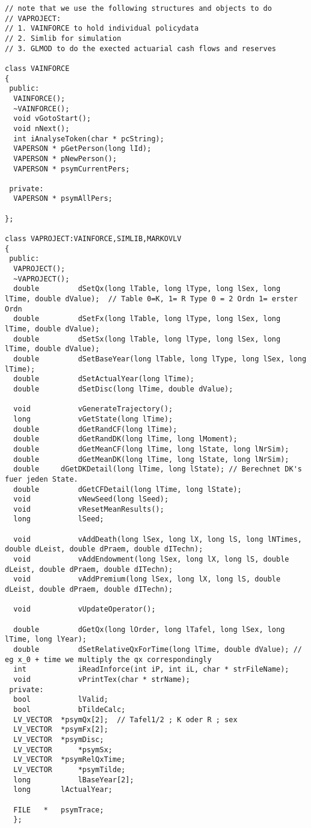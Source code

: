 \documentclass[10pt, a4paper,landscape]{article}
\begin{document}
\begin{verbatim}
// note that we use the following structures and objects to do
// VAPROJECT:
// 1. VAINFORCE to hold individual policydata
// 2. Simlib for simulation
// 3. GLMOD to do the exected actuarial cash flows and reserves

class VAINFORCE
{
 public:
  VAINFORCE();
  ~VAINFORCE();
  void vGotoStart();
  void nNext();
  int iAnalyseToken(char * pcString);
  VAPERSON * pGetPerson(long lId);
  VAPERSON * pNewPerson();
  VAPERSON * psymCurrentPers;

 private:
  VAPERSON * psymAllPers;

};

class VAPROJECT:VAINFORCE,SIMLIB,MARKOVLV
{
 public:
  VAPROJECT();
  ~VAPROJECT();
  double         dSetQx(long lTable, long lType, long lSex, long lTime, double dValue);  // Table 0=K, 1= R Type 0 = 2 Ordn 1= erster Ordn  
  double         dSetFx(long lTable, long lType, long lSex, long lTime, double dValue);
  double         dSetSx(long lTable, long lType, long lSex, long lTime, double dValue);
  double         dSetBaseYear(long lTable, long lType, long lSex, long lTime);
  double         dSetActualYear(long lTime);
  double         dSetDisc(long lTime, double dValue);

  void           vGenerateTrajectory();
  long           vGetState(long lTime);
  double         dGetRandCF(long lTime);
  double         dGetRandDK(long lTime, long lMoment);
  double         dGetMeanCF(long lTime, long lState, long lNrSim);
  double         dGetMeanDK(long lTime, long lState, long lNrSim);
  double	 dGetDKDetail(long lTime, long lState); // Berechnet DK's fuer jeden State.
  double         dGetCFDetail(long lTime, long lState);
  void           vNewSeed(long lSeed);
  void           vResetMeanResults();
  long           lSeed;

  void           vAddDeath(long lSex, long lX, long lS, long lNTimes, double dLeist, double dPraem, double dITechn); 
  void           vAddEndowment(long lSex, long lX, long lS, double dLeist, double dPraem, double dITechn);
  void           vAddPremium(long lSex, long lX, long lS, double dLeist, double dPraem, double dITechn);

  void           vUpdateOperator();

  double         dGetQx(long lOrder, long lTafel, long lSex, long lTime, long lYear);
  double         dSetRelativeQxForTime(long lTime, double dValue); // eg x_0 + time we multiply the qx correspondingly
  int            iReadInforce(int iP, int iL, char * strFileName);
  void           vPrintTex(char * strName);
 private:
  bool           lValid;
  bool           bTildeCalc;
  LV_VECTOR	 *psymQx[2];  // Tafel1/2 ; K oder R ; sex
  LV_VECTOR	 *psymFx[2];
  LV_VECTOR	 *psymDisc;
  LV_VECTOR      *psymSx;
  LV_VECTOR	 *psymRelQxTime;
  LV_VECTOR      *psymTilde;
  long           lBaseYear[2];
  long		 lActualYear;

  FILE   *   psymTrace;
  };


\end{verbatim}
\end{document}

